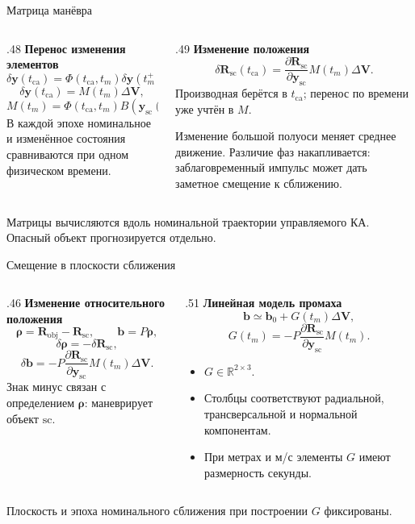 \documentclass[11pt,aspectratio=169,t]{beamer}
\newcommand{\eqcompact}{\fontsize{10}{12}\selectfont}
\newcommand{\derivationmathspacing}{%
  \setlength{\abovedisplayskip}{2pt}%
  \setlength{\belowdisplayskip}{3pt}%
  \setlength{\abovedisplayshortskip}{2pt}%
  \setlength{\belowdisplayshortskip}{2pt}%
  \setlength{\jot}{2pt}}
\newcommand{\vect}[1]{\boldsymbol{#1}}
\begin{document}
\begin{frame}{Матрица манёвра}
\relax\derivationmathspacing
\begin{columns}[T,onlytextwidth]
\begin{column}{.48\textwidth}
\textbf{Перенос изменения элементов}
{\eqcompact\derivationmathspacing
\[
 \delta\vect y(t_{\mathrm{ca}})
 =\Phi(t_{\mathrm{ca}},t_m)\delta\vect y(t_m^+),
\]
\[
 \delta\vect y(t_{\mathrm{ca}})=M(t_m)\Delta\vect V,
\]
\[
 \boxed{M(t_m)=\Phi(t_{\mathrm{ca}},t_m)B(\vect y_{\mathrm{sc}}(t_m)).}
\]
}
В каждой эпохе номинальное и изменённое состояния сравниваются при одном физическом времени.
\end{column}
\begin{column}{.49\textwidth}
\textbf{Изменение положения}
{\eqcompact\derivationmathspacing
\[
 \boxed{\delta\vect R_{\mathrm{sc}}(t_{\mathrm{ca}})
 =\frac{\partial\vect R_{\mathrm{sc}}}{\partial\vect y_{\mathrm{sc}}}
 M(t_m)\Delta\vect V.}
\]
}
Производная берётся в $t_{\mathrm{ca}}$; перенос по времени уже учтён в $M$.
\par\smallskip
Изменение большой полуоси меняет среднее движение. Различие фаз накапливается: заблаговременный импульс может дать заметное смещение к сближению.
\end{column}
\end{columns}
\smallskip
Матрицы вычисляются вдоль номинальной траектории управляемого КА. Опасный объект прогнозируется отдельно.
\end{frame}

\begin{frame}{Смещение в плоскости сближения}
\relax\derivationmathspacing
\begin{columns}[T,onlytextwidth]
\begin{column}{.46\textwidth}
\textbf{Изменение относительного положения}
{\eqcompact\derivationmathspacing
\[
 \vect\rho=\vect R_{\mathrm{obj}}-\vect R_{\mathrm{sc}},
 \qquad\vect b=P\vect\rho,
\]
\[
 \delta\vect\rho=-\delta\vect R_{\mathrm{sc}},
\]
\[
 \delta\vect b=-P\frac{\partial\vect R_{\mathrm{sc}}}
 {\partial\vect y_{\mathrm{sc}}}M(t_m)\Delta\vect V.
\]
}
Знак минус связан с определением $\vect\rho$: маневрирует объект $\mathrm{sc}$.
\end{column}
\begin{column}{.51\textwidth}
\textbf{Линейная модель промаха}
{\eqcompact\derivationmathspacing
\[
 \boxed{\vect b\simeq\vect b_0+G(t_m)\Delta\vect V,}
\]
\[
 \boxed{G(t_m)=-P\frac{\partial\vect R_{\mathrm{sc}}}
 {\partial\vect y_{\mathrm{sc}}}M(t_m).}
\]
}
\begin{itemize}
\setlength{\itemsep}{2pt}
\item $G\in\mathbb R^{2\times3}$.
\item Столбцы соответствуют радиальной, трансверсальной и нормальной компонентам.
\item При метрах и м/с элементы $G$ имеют размерность секунды.
\end{itemize}
\end{column}
\end{columns}
\smallskip
Плоскость и эпоха номинального сближения при построении $G$ фиксированы.
\end{frame}
\end{document}
